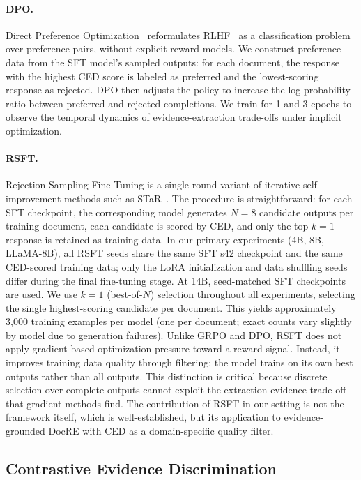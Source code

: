 \paragraph{DPO.}
Direct Preference Optimization~\citep{rafailov2023direct} reformulates RLHF~\citep{ouyang2022instructgpt} as a classification problem over preference pairs, without explicit reward models. We construct preference data from the SFT model's sampled outputs: for each document, the response with the highest CED score is labeled as preferred and the lowest-scoring response as rejected. DPO then adjusts the policy to increase the log-probability ratio between preferred and rejected completions. We train for 1 and 3 epochs to observe the temporal dynamics of evidence-extraction trade-offs under implicit optimization.

\paragraph{RSFT.}
Rejection Sampling Fine-Tuning is a single-round variant of iterative self-improvement methods such as STaR~\citep{zelikman2022star}. The procedure is straightforward: for each SFT checkpoint, the corresponding model generates $N{=}8$ candidate outputs per training document, each candidate is scored by CED, and only the top-$k{=}1$ response is retained as training data. In our primary experiments (4B, 8B, LLaMA-8B), all RSFT seeds share the same SFT s42 checkpoint and the same CED-scored training data; only the LoRA initialization and data shuffling seeds differ during the final fine-tuning stage. At 14B, seed-matched SFT checkpoints are used. We use $k{=}1$ (best-of-$N$) selection throughout all experiments, selecting the single highest-scoring candidate per document. This yields approximately 3,000 training examples per model (one per document; exact counts vary slightly by model due to generation failures). Unlike GRPO and DPO, RSFT does not apply gradient-based optimization pressure toward a reward signal. Instead, it improves training data quality through filtering: the model trains on its own best outputs rather than all outputs. This distinction is critical because discrete selection over complete outputs cannot exploit the extraction-evidence trade-off that gradient methods find. The contribution of RSFT in our setting is not the framework itself, which is well-established, but its application to evidence-grounded DocRE with CED as a domain-specific quality filter.


\subsection{Contrastive Evidence Discrimination}
\label{sec:ced}

